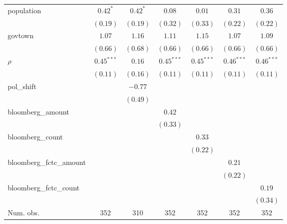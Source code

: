 \begin{table}[!h]
\begin{center}
\begin{tabular}{l c c c c c c }
population              & $0.42^{*}$   & $0.42^{*}$   & $0.08$       & $0.01$       & $0.31$       & $0.36$       \\
                        & $(0.19)$     & $(0.19)$     & $(0.32)$     & $(0.33)$     & $(0.22)$     & $(0.22)$     \\
govtown                 & $1.07$       & $1.16$       & $1.11$       & $1.15$       & $1.07$       & $1.09$       \\
                        & $(0.66)$     & $(0.68)$     & $(0.66)$     & $(0.66)$     & $(0.66)$     & $(0.66)$     \\
$\rho$                  & $0.45^{***}$ & $0.16$       & $0.45^{***}$ & $0.45^{***}$ & $0.46^{***}$ & $0.46^{***}$ \\
                        & $(0.11)$     & $(0.16)$     & $(0.11)$     & $(0.11)$     & $(0.11)$     & $(0.11)$     \\
pol\_shift              &              & $-0.77$      &              &              &              &              \\
                        &              & $(0.49)$     &              &              &              &              \\
bloomberg\_amount       &              &              & $0.42$       &              &              &              \\
                        &              &              & $(0.33)$     &              &              &              \\
bloomberg\_count        &              &              &              & $0.33$       &              &              \\
                        &              &              &              & $(0.22)$     &              &              \\
bloomberg\_fctc\_amount &              &              &              &              & $0.21$       &              \\
                        &              &              &              &              & $(0.22)$     &              \\
bloomberg\_fctc\_count  &              &              &              &              &              & $0.19$       \\
                        &              &              &              &              &              & $(0.34)$     \\
\midrule
Num. obs.               & 352          & 310          & 352          & 352          & 352          & 352          \\

\end{tabular}
\end{center}
\end{table}
